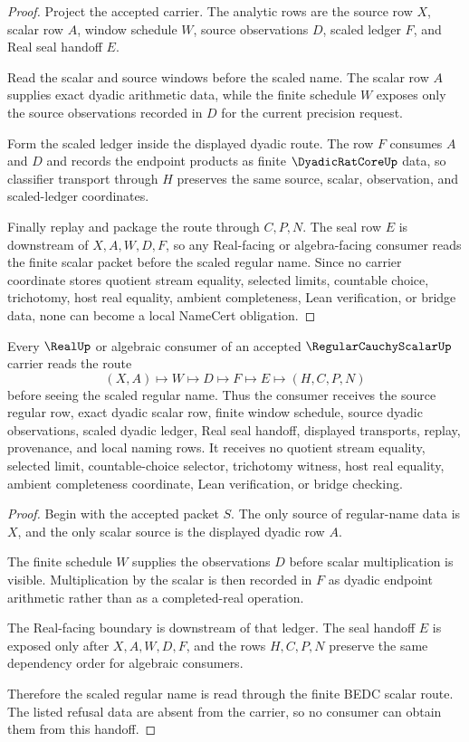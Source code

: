 \begin{proof}
Project the accepted carrier. The analytic rows are the source row $X$, scalar row $A$, window schedule $W$, source observations $D$, scaled ledger $F$, and Real seal handoff $E$.

Read the scalar and source windows before the scaled name. The scalar row $A$ supplies exact dyadic arithmetic data, while the finite schedule $W$ exposes only the source observations recorded in $D$ for the current precision request.

Form the scaled ledger inside the displayed dyadic route. The row $F$ consumes $A$ and $D$ and records the endpoint products as finite $\DyadicRatCoreUp$ data, so classifier transport through $H$ preserves the same source, scalar, observation, and scaled-ledger coordinates.

Finally replay and package the route through $C,P,N$. The seal row $E$ is downstream of $X,A,W,D,F$, so any Real-facing or algebra-facing consumer reads the finite scalar packet before the scaled regular name. Since no carrier coordinate stores quotient stream equality, selected limits, countable choice, trichotomy, host real equality, ambient completeness, Lean verification, or bridge data, none can become a local NameCert obligation.
\end{proof}

\begin{theorem}
\label{thm:regular-cauchy-scalar-real-handoff}
Every $\RealUp$ or algebraic consumer of an accepted $\RegularCauchyScalarUp$ carrier reads the route
$$
(X,A)\longmapsto W\longmapsto D\longmapsto F\longmapsto E\longmapsto(H,C,P,N)
$$
before seeing the scaled regular name. Thus the consumer receives the source regular row, exact dyadic scalar row, finite window schedule, source dyadic observations, scaled dyadic ledger, Real seal handoff, displayed transports, replay, provenance, and local naming rows. It receives no quotient stream equality, selected limit, countable-choice selector, trichotomy witness, host real equality, ambient completeness coordinate, Lean verification, or bridge checking.
\end{theorem}
\begin{proof}
Begin with the accepted packet $S$. The only source of regular-name data is $X$, and the only scalar source is the displayed dyadic row $A$.

The finite schedule $W$ supplies the observations $D$ before scalar multiplication is visible. Multiplication by the scalar is then recorded in $F$ as dyadic endpoint arithmetic rather than as a completed-real operation.

The Real-facing boundary is downstream of that ledger. The seal handoff $E$ is exposed only after $X,A,W,D,F$, and the rows $H,C,P,N$ preserve the same dependency order for algebraic consumers.

Therefore the scaled regular name is read through the finite BEDC scalar route. The listed refusal data are absent from the carrier, so no consumer can obtain them from this handoff.
\end{proof}


